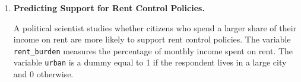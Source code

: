 \documentclass[12pt]{article}
\newif\ifsolutions
\begin{document}
\begin{enumerate}

    \item \textbf{Predicting Support for Rent Control Policies.}

    A political scientist studies whether citizens who spend a larger share of their income on rent are more likely to support rent control policies. The variable \texttt{rent\_burden} measures the percentage of monthly income spent on rent. The variable \texttt{urban} is a dummy equal to 1 if the respondent lives in a large city and 0 otherwise.


\end{enumerate}
\end{document}
